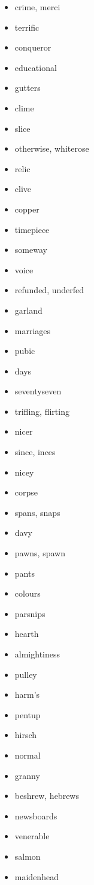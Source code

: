 \documentclass{article}
\begin{document}
\begin{itemize}
    \item crime, merci
    \item terrific
    \item conqueror
    \item educational
    \item gutters
    \item clime
    \item slice
    \item otherwise, whiterose
    \item relic
    \item clive
    \item copper
    \item timepiece
    \item someway
    \item voice
    \item refunded, underfed
    \item garland
    \item marriages
    \item pubic
    \item days
    \item seventyseven
    \item trifling, flirting
    \item nicer
    \item since, inces
    \item nicey
    \item corpse
    \item spans, snaps
    \item davy
    \item pawns, spawn
    \item pants
    \item colours
    \item parsnips
    \item hearth
    \item almightiness
    \item pulley
    \item harm's
    \item pentup
    \item hirsch
    \item normal
    \item granny
    \item beshrew, hebrews
    \item newsboards
    \item venerable
    \item salmon
    \item maidenhead

\end{itemize}
\end{document}
